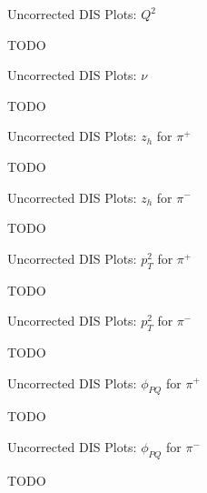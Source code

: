 \begin{frame}{Uncorrected DIS Plots: $Q^2$}
    \label{20.10a::q2}

    TODO

\end{frame}

\begin{frame}{Uncorrected DIS Plots: $\nu$}
    \label{20.10b::nu}

    TODO

\end{frame}

\begin{frame}{Uncorrected DIS Plots: $z_h$ for $\pi^+$}
    \label{20.10c::zh_pi+}

    TODO

\end{frame}

\begin{frame}{Uncorrected DIS Plots: $z_h$ for $\pi^-$}
    \label{20.10d::zh_pi-}

    TODO

\end{frame}

\begin{frame}{Uncorrected DIS Plots: $p_T^2$ for $\pi^+$}
    \label{20.10e::pt2_pi+}

    TODO

\end{frame}

\begin{frame}{Uncorrected DIS Plots: $p_T^2$ for $\pi^-$}
    \label{20.10f::pt2_pi-}

    TODO

\end{frame}

\begin{frame}{Uncorrected DIS Plots: $\phi_{PQ}$ for $\pi^+$}
    \label{20.10g::phipq_pi+}

    TODO

\end{frame}

\begin{frame}{Uncorrected DIS Plots: $\phi_{PQ}$ for $\pi^-$}
    \label{20.10h::phipq_pi-}

    TODO

\end{frame}
